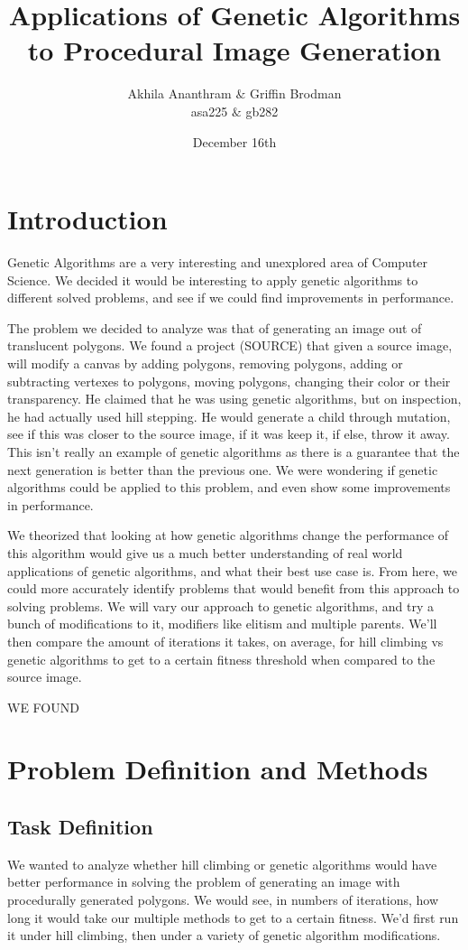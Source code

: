 \documentclass[12pt,letterpaper]{article}
\author{Akhila Ananthram $\&$ Griffin Brodman\\asa225 $\&$ gb282}
\title{Applications of Genetic Algorithms to Procedural Image Generation }
\date{December 16th}
\begin{document}
\maketitle
\section{Introduction}
Genetic Algorithms are a very interesting and unexplored area of Computer Science. We decided it would be interesting to apply genetic algorithms to different solved problems, and see if we could find improvements in performance. 

The problem we decided to analyze was that of generating an image out of translucent polygons. We found a project (SOURCE) that given a source image, will modify a canvas by adding polygons, removing polygons, adding or subtracting vertexes to polygons, moving polygons, changing their color or their transparency. He claimed that he was using genetic algorithms, but on inspection, he had actually used hill stepping. He would generate a child through mutation, see if this was closer to the source image, if it was keep it, if else, throw it away. This isn't really an example of genetic algorithms as there is a guarantee that the next generation is better than the previous one. We were wondering if genetic algorithms could be applied to this problem, and even show some improvements in performance. 

We theorized that looking at how genetic algorithms change the performance of this algorithm would give us a much better understanding of real world applications of genetic algorithms, and what their best use case is. From here, we could more accurately identify problems that would benefit from this approach to solving problems. We will vary our approach to genetic algorithms, and try a bunch of modifications to it, modifiers like elitism and multiple parents. We'll then compare the amount of iterations it takes, on average, for hill climbing vs genetic algorithms to get to a certain fitness threshold when compared to the source image.

WE FOUND


\section{Problem Definition and Methods}

\subsection{Task Definition}
We wanted to analyze whether hill climbing or genetic algorithms would have better performance in solving the problem of generating an image with procedurally generated polygons. We would see, in numbers of iterations, how long it would take our multiple methods to get to a certain fitness. We'd first run it under hill climbing, then under a variety of genetic algorithm modifications.
\end{document}
